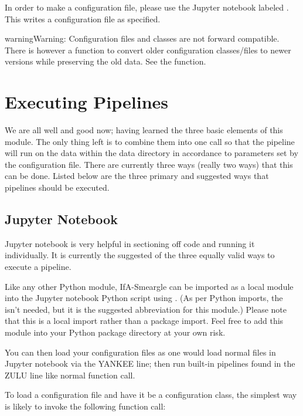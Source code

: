 \documentclass[letterpaper,10pt,english]{sphinxmanual}
\begin{document}
In order to make a configuration file, please use the Jupyter notebook labeled
. This writes a configuration file as
specified.

\begin{sphinxadmonition}{warning}{Warning:}
Configuration files and classes are not forward compatible. There
is however a function to convert older configuration classes/files to newer
versions while preserving the old data. See the  function.
\end{sphinxadmonition}


\section{Executing Pipelines}
\label{\detokenize{quickstart:executing-pipelines}}
We are all well and good now; having learned the three basic elements of this
module. The only thing left is to combine them into one call so that the
pipeline will run on the data within the data directory in accordance to
parameters set by the configuration file. There are currently three ways
(really two ways) that this can be done. Listed below are the three primary
and suggested ways that pipelines should be executed.


\subsection{Jupyter Notebook}
\label{\detokenize{quickstart:jupyter-notebook}}
Jupyter notebook is very helpful in sectioning off code and running it
individually. It is currently the suggested of the three equally valid ways
to execute a pipeline.

Like any other Python module, IfA-Smeargle can be imported as a local module
into the Jupyter notebook Python script using .
(As per Python imports, the  isn’t needed, but it is the suggested
abbreviation for this module.) Please note that this is a local import rather
than a package import. Feel free to add this module into your Python package
directory at your own risk.

You can then load your configuration files as one would load normal files in
Jupyter notebook via the YANKEE line; then run built-in pipelines found in the
ZULU line like normal function call.

To load a configuration file and have it be a configuration class, the simplest
way is likely to invoke the following function call:
\end{document}

